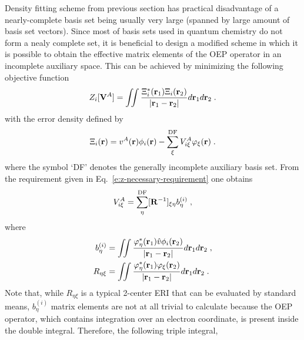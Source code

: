 Density fitting scheme from previous section has practical disadvantage of a nearly\hyp{}complete basis set
being usually very large (spanned by large amount of basis set vectors). 
Since most of basis sets used in quantum chemistry do not form a nealy complete
set, it is beneficial to design a modified scheme in which it is possible to obtain the effective 
matrix elements of the OEP operator in an incomplete auxiliary space. This can be achieved by minimizing 
the following objective function
%
\begin{equation} \label{e:z-incompl}
	Z_i[{\bf V}^A] = \iint 
        \frac{ \Xi_i^*({\bf r}_1) \Xi_i({\bf r}_2) }{\vert {\bf r}_1 - {\bf r}_2 \vert}  
         d{\bf r}_1 d{\bf r}_2  \;.
\end{equation}
%
with the error density defined by
%
\begin{equation} \label{e:error-incompl}
 \Xi_i({\bf r}) = v^A({\bf r}) \phi_i({\bf r}) - \sum_\xi^{\rm DF} V^A_{i\xi} \varphi_\xi({\bf r}) \;.
\end{equation}
%
where the symbol `DF' denotes the generally incomplete auxiliary basis set.
From the requirement given in Eq.~\eqref{e:z-necessary-requirement}
one obtains
%
\begin{equation} \label{e:v-incompl}
  V^A_{i\xi} = \sum_\eta^{\rm DF} [{\bf R}^{-1}]_{\xi\eta} b^{(i)}_\eta \;,
\end{equation}
%
where 
%
\begin{subequations}
\begin{align}
 b^{(i)}_\eta &= \iint 
                       \frac{ \varphi^*_\eta({\bf r}_1) \hat{v} \phi_i({\bf r}_2) } 
                            {\vert {\bf r}_1 - {\bf r}_2\vert}  
                 d{\bf r}_1 d{\bf r}_2 \;, \\
 R_{\eta\xi}  &= \iint 
                       \frac{ \varphi^*_\eta({\bf r}_1) \varphi_\xi({\bf r}_2) } 
                            {\vert {\bf r}_1 - {\bf r}_2\vert}  
                 d{\bf r}_1 d{\bf r}_2 \;.
\end{align}
\end{subequations}
%
Note that, while $R_{\eta\xi}$ is a typical 2\hyp{}center ERI 
that can be evaluated by standard means,
$b^{(i)}_\eta$ matrix elements are not at all trivial to calculate
because the OEP operator, which contains integration over an electron coordinate,
is present inside the double integral. Therefore, the following triple integral,
